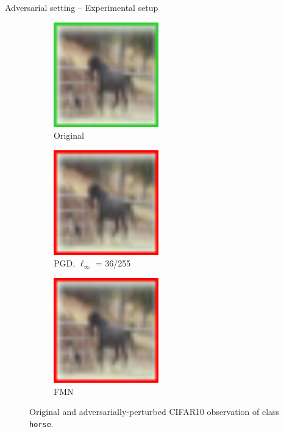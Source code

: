 \begin{frame}{Adversarial setting -- Experimental setup}
		\begin{figure}[H]
			\centering
			\begin{subfigure}[t]{0.3\textwidth}
				\centering
				\includegraphics[width=0.5\textwidth]{img/adversarial/adv_unperturbed_framed.png}
				\caption{Original}
			\end{subfigure}
			\hspace{1em}
			\begin{subfigure}[t]{0.3\textwidth}
				\centering
				\includegraphics[width=0.5\textwidth]{img/adversarial/adv_pgd_framed.png}
				\caption{PGD, $\ell_\infty$ = 36/255}
			\end{subfigure}
			\hspace{1em}
			\begin{subfigure}[t]{0.3\textwidth}
				\centering
				\includegraphics[width=0.5\textwidth]{img/adversarial/adv_fmn_framed.png}
				\caption{FMN}
			\end{subfigure}
			\caption{Original and adversarially-perturbed CIFAR10 observation of class \texttt{horse}.}
		\end{figure}
\end{frame}

